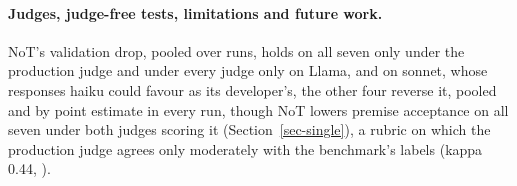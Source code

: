 \paragraph{Judges, judge-free tests, limitations and future work.}
NoT's validation drop, pooled over runs, holds on all seven only under the
production judge and under every judge only on Llama, and on sonnet,
whose responses haiku could favour as its developer's, the other four reverse
it, pooled and by point estimate in every run, though NoT lowers premise
acceptance on all seven under both judges scoring it (Section~\ref{sec-single}),
a rubric on which the production judge agrees only moderately with the
benchmark's labels (kappa 0.44, \citealp{cohen60}).
